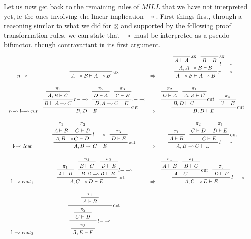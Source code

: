 \documentclass[a4paper, 12pt, twoside,openright]{report}
\begin{document}
Let us now get back to the remaining rules of $MILL$ that  we have not interpreted yet, ie the ones involving the linear implication $\multimap$.  
First things first, through a reasoning similar to what we did for $\otimes$ and supported by the following proof transformation rules, we can state that $\multimap$ must be interpreted as a pseudo-bifunctor, though contravariant in its first argument. 
$$%
 \begin{array}{cccc}
\eta \multimap
&
 \prftree[r]{ax}
	{A\multimap B \vdash A \multimap B} 
&
\Rightarrow
&
\prftree[r]{$r-\multimap$}
	{\prftree[r]{$l-\multimap$}
		{\prftree[r]{ax}{A\vdash A}}
		{\prftree[r]{ax}{B \vdash B}}
		{A, A \multimap B \vdash B}
	}
	{A \multimap B \vdash A \multimap B}
\\
\\
\text{ r-$\multimap$  l-$\multimap$  } cut
&
\prftree[r]{cut}
	{\prftree[r]{$r-\multimap$}
		{\prftree{\pi_1}{A,B\vdash C}}
		{B \vdash A \multimap C}
	}
	{\prftree[r]{$l-\multimap$}
		{\prftree{\pi_2}{D \vdash A}}
		{\prftree{\pi_3}{C \vdash E}}
		{D,A\multimap C \vdash E}
	}
	{B,D  \vdash E}
&
\Rightarrow
&
\prftree[r]{cut}
	{\prftree[r]{cut}
		{\prftree{\pi_2}{D \vdash A}}
		{\prftree{\pi_1}{A,B \vdash C}}
		{B,D\vdash C}
	}
	{\prftree{\pi_3}{C\vdash E}}
	{B,D\vdash E}
\\
\\
\text{l-$\multimap$ } lcut
&
\prftree[r]{cut}
	{
	\prftree[r]{$l-\multimap$}
		{\prftree{\pi_1}{A \vdash B}}
		{\prftree{\pi_2}{C \vdash D}}
		{A,B\multimap C \vdash D }
	}
	{\prftree{\pi_3}{D\vdash E}}
	{A,B \multimap C \vdash  E}
&
\Rightarrow
&
\prftree[r]{$l-\multimap$}
	{\prftree{\pi_1}{A \vdash B}}
	{\prftree[r]{cut}
		{\prftree{\pi_2}{C \vdash D}}
		{\prftree{\pi_3}{D\vdash E}}
		{C \vdash E}
	}
	{A,B \multimap C \vdash  E}
\\
\\
\text{l-$\multimap$ } rcut_1
&
\prftree[r]{cut}
	{\prftree{\pi_1}{A\vdash B}}
	{
	\prftree[r]{$l-\multimap$}
		{\prftree{\pi_2}{B \vdash C}}
		{\prftree{\pi_3}{D \vdash E}}
		{B,C\multimap D \vdash  E}
	}
	{A, C \multimap D \vdash E}
&
\Rightarrow
&
\prftree[r]{$l-\multimap$}
	{\prftree[r]{cut}
		{\prftree{\pi_1}{A\vdash B}}
		{\prftree{\pi_2}{B \vdash C}}
		{A \vdash C}
	}
	{\prftree{\pi_3}{D \vdash E}}
	{A, C \multimap D \vdash E}
\\
\\
\text{l-$\multimap$ } rcut_2
&
\prftree[r]{cut}
	{\prftree{\pi_1}{A\vdash B}}
	{
	\prftree[r]{$l-\multimap$}
		{\prftree{\pi_2}{C \vdash D}}
		{\prftree{\pi_3}{B,E \vdash F}}
}
\end{array}$$
\end{document}
